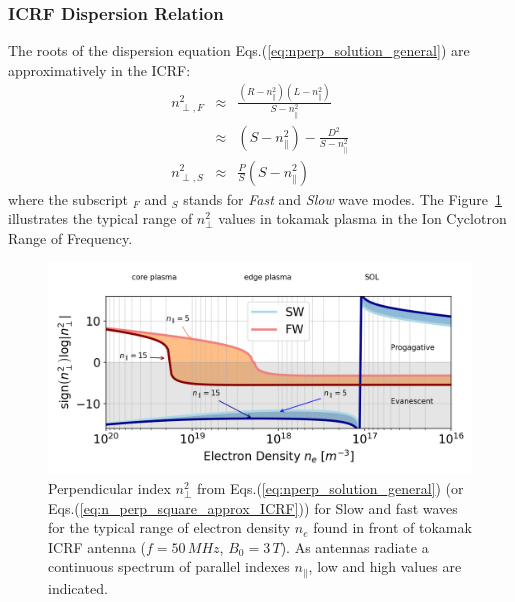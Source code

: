 \subsubsection{ICRF Dispersion Relation}
The roots of the dispersion equation Eqs.(\ref{eq:nperp_solution_general}) are approximatively in the ICRF:
\begin{subequations}
\begin{eqnarray}
n_{\perp, F}^2 &\approx& \frac{\left(R - n_\parallel^2 \right)\left(L - n_\parallel^2\right)}{S-n_\parallel^2} \\
			   &\approx& \left(S-n_\parallel^2 \right) - \frac{D^2}{S-n_\parallel^2} \nonumber \\
n_{\perp, S}^2 &\approx& \frac{P}{S}\left(S - n_\parallel^2 \right)
\label{eq:n_perp_square_approx_ICRF}		  
\end{eqnarray}
\end{subequations}
where the subscript $_F$ and $_S$ stands for \textit{Fast} and \textit{Slow} wave modes. The Figure~\ref{fig:nperpsquarevsne_ICRF} illustrates the typical range of $n_\perp^2$ values in tokamak plasma in the Ion Cyclotron Range of Frequency. 

\begin{figure}[h]
	\centering
	\includegraphics[width=1.0\linewidth]{figures/chap2/n_perp_square_vs_ne_ICRF}
	\caption{Perpendicular index $n_\perp^2$ from Eqs.(\ref{eq:nperp_solution_general}) (or Eqs.(\ref{eq:n_perp_square_approx_ICRF})) for Slow and fast waves for the typical range of electron density $n_e$ found in front of tokamak ICRF antenna ($f=50\,\si{MHz}$, $B_0=3\,\si{T}$). As antennas radiate a continuous spectrum of parallel indexes $n_\parallel$, low and high values are indicated.}
	\label{fig:nperpsquarevsne_ICRF}
\end{figure}


